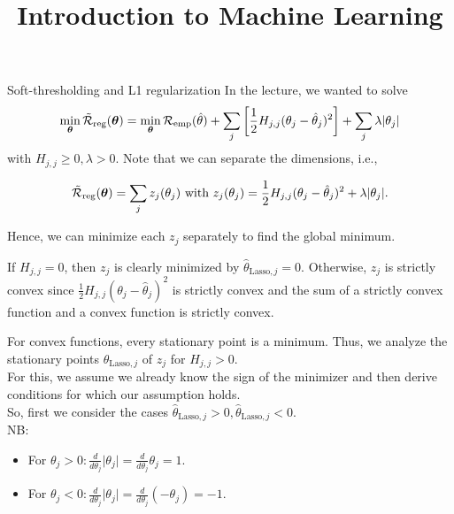 \documentclass[11pt,compress,t,notes=noshow, xcolor=table]{beamer}
\title{Introduction to Machine Learning}
\date{}
\begin{document}



\begin{vbframe}{Soft-thresholding and L1 regularization}
In the lecture, we wanted to solve
     \[
      \min_{\bm{\theta}} \mathcal{\tilde R}_{\text{reg}}(\bm{\theta}) =  \min_{\bm{\theta}}\mathcal{R}_{\text{emp}}(\hat{\theta}) + \sum_j \left[ \frac{1}{2} H_{j,j} (\theta_j - \hat{\theta}_j)^2 \right] + \sum_j \lambda |\theta_j|
      \]
with $H_{j,j} \geq 0, \lambda > 0$. Note that we can separate the dimensions, i.e.,

\[\mathcal{\tilde R}_{\text{reg}}(\bm{\theta}) = \sum_j z_j(\theta_j) \text{ with } z_j(\theta_j) = \frac{1}{2} H_{j,j} (\theta_j - \hat{\theta}_j)^2 + \lambda |\theta_j|.\]
      
Hence, we can minimize each $z_j$ separately to find the global minimum. \\
\lz

If $H_{j,j} = 0$, then $z_j$ is clearly minimized by $\hat{\theta}_{\text{Lasso},j} = 0.$ Otherwise, $z_j$ is strictly convex since $\frac{1}{2} H_{j,j} (\theta_j - \hat{\theta}_j)^2$ is strictly convex and the sum of a strictly convex function and a convex function is strictly convex. \\


\framebreak

For convex functions, every stationary point is a minimum.
Thus, we analyze the stationary points $\hat{\theta}_{\text{Lasso},j}$ of $z_j$ for $H_{j,j} > 0.$ \\
\lz 
For this, we assume we already know the sign of the minimizer and then derive conditions for which our assumption holds. \\
\lz 
So, first we consider the cases $\hat{\theta}_{\text{Lasso},j} > 0, \hat{\theta}_{\text{Lasso},j} < 0.$\\
\lz
NB: 
\begin{itemize}
    \item For $\theta_j > 0: \frac{d}{d\theta_j}\vert \theta_j\vert = \frac{d}{d\theta_j}\theta_j = 1.$
    \item For $\theta_j < 0: \frac{d}{d\theta_j}\vert \theta_j\vert = \frac{d}{d\theta_j}\left(-\theta_j\right) = -1$.
\end{itemize}

\framebreak


\end{vbframe}
\end{document}
